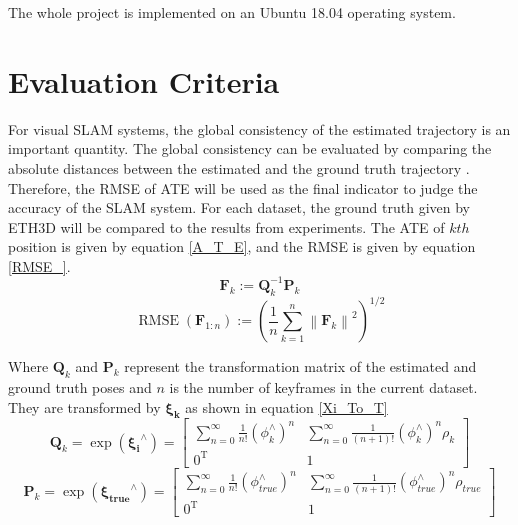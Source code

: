 The whole project is implemented on an Ubuntu 18.04 operating system. 

\section{Evaluation Criteria}
For visual SLAM systems, the global consistency of the estimated trajectory is an important quantity. The global consistency can be evaluated by comparing the absolute distances between the estimated and the ground truth trajectory \parencite{6385773}. Therefore, the \ac{RMSE} of \ac{ATE} will be used as the final indicator to judge the accuracy of the SLAM system. For each dataset, the ground truth given by ETH3D will be compared to the results from experiments. The ATE of $kth$ position is given by equation \ref{A_T_E}, and the RMSE is given by equation \ref{RMSE_}.
\begin{equation}
    \mathbf{F}_{k}:=\mathbf{Q}_{k}^{-1} \mathbf{P}_{k}
    \label{A_T_E}
\end{equation}
\begin{equation}
    \operatorname{RMSE}\left(\mathbf{F}_{1: n}\right):=\left(\frac{1}{n} \sum_{k=1}^{n}\left\|\mathbf{F}_{k}\right\|^{2}\right)^{1 / 2}
    \label{RMSE_}
\end{equation}

Where $\mathbf{Q}_{k}$ and $\mathbf{P}_{k}$ represent the transformation matrix of the estimated and ground truth poses and $n$ is the number of keyframes in the current dataset. They are transformed by $\boldsymbol{\xi_{k}}$ as shown in equation \ref{Xi_To_T}
\begin{equation}
    \mathbf{Q}_{k}=\exp \left(\boldsymbol{\xi_i}^{\wedge}\right)=\left[\begin{array}{cc}
        \sum_{n=0}^{\infty} \frac{1}{n !}\left(\phi_k^{\wedge}\right)^{n} & \sum_{n=0}^{\infty} \frac{1}{(n+1) !}\left(\phi_k^{\wedge}\right)^{n} \rho_k \\
        0^{\mathrm{T}} & 1
        \end{array}\right]
    \label{Xi_To_T}
\end{equation}
\begin{equation}
    \mathbf{P}_{k}=\exp \left(\boldsymbol{\xi_{true}}^{\wedge}\right)=\left[\begin{array}{cc}
        \sum_{n=0}^{\infty} \frac{1}{n !}\left(\phi_{true}^{\wedge}\right)^{n} & \sum_{n=0}^{\infty} \frac{1}{(n+1) !}\left(\phi_{true}^{\wedge}\right)^{n} \rho_{true} \\
        0^{\mathrm{T}} & 1
        \end{array}\right]
    \label{Xi_To_T}
\end{equation}

